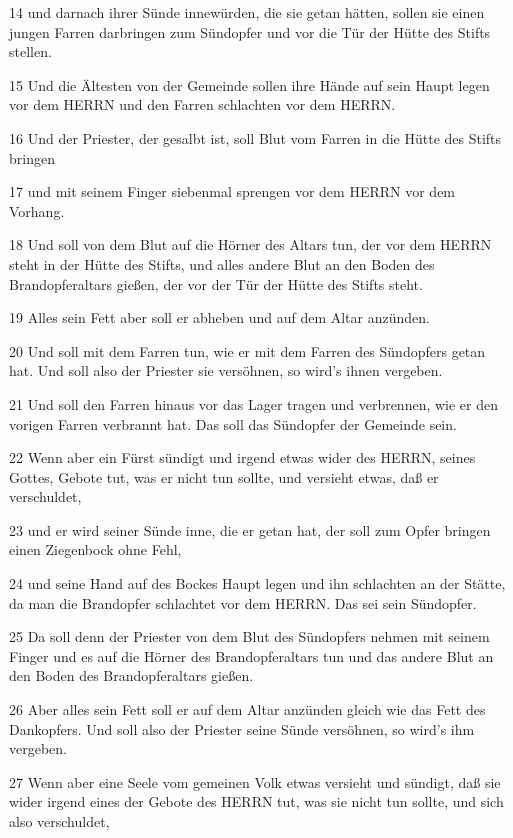 \par 14 und darnach ihrer Sünde innewürden, die sie getan hätten, sollen sie einen jungen Farren darbringen zum Sündopfer und vor die Tür der Hütte des Stifts stellen.
\par 15 Und die Ältesten von der Gemeinde sollen ihre Hände auf sein Haupt legen vor dem HERRN und den Farren schlachten vor dem HERRN.
\par 16 Und der Priester, der gesalbt ist, soll Blut vom Farren in die Hütte des Stifts bringen
\par 17 und mit seinem Finger siebenmal sprengen vor dem HERRN vor dem Vorhang.
\par 18 Und soll von dem Blut auf die Hörner des Altars tun, der vor dem HERRN steht in der Hütte des Stifts, und alles andere Blut an den Boden des Brandopferaltars gießen, der vor der Tür der Hütte des Stifts steht.
\par 19 Alles sein Fett aber soll er abheben und auf dem Altar anzünden.
\par 20 Und soll mit dem Farren tun, wie er mit dem Farren des Sündopfers getan hat. Und soll also der Priester sie versöhnen, so wird's ihnen vergeben.
\par 21 Und soll den Farren hinaus vor das Lager tragen und verbrennen, wie er den vorigen Farren verbrannt hat. Das soll das Sündopfer der Gemeinde sein.
\par 22 Wenn aber ein Fürst sündigt und irgend etwas wider des HERRN, seines Gottes, Gebote tut, was er nicht tun sollte, und versieht etwas, daß er verschuldet,
\par 23 und er wird seiner Sünde inne, die er getan hat, der soll zum Opfer bringen einen Ziegenbock ohne Fehl,
\par 24 und seine Hand auf des Bockes Haupt legen und ihn schlachten an der Stätte, da man die Brandopfer schlachtet vor dem HERRN. Das sei sein Sündopfer.
\par 25 Da soll denn der Priester von dem Blut des Sündopfers nehmen mit seinem Finger und es auf die Hörner des Brandopferaltars tun und das andere Blut an den Boden des Brandopferaltars gießen.
\par 26 Aber alles sein Fett soll er auf dem Altar anzünden gleich wie das Fett des Dankopfers. Und soll also der Priester seine Sünde versöhnen, so wird's ihm vergeben.
\par 27 Wenn aber eine Seele vom gemeinen Volk etwas versieht und sündigt, daß sie wider irgend eines der Gebote des HERRN tut, was sie nicht tun sollte, und sich also verschuldet,
